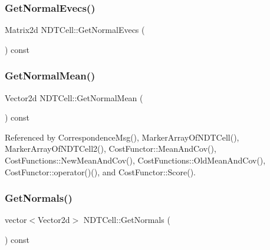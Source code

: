 \mbox{\label{classNDTCell_a15edc678da9fcc206a2a1697bc893463}} 
\subsubsection{\texorpdfstring{Get\+Normal\+Evecs()}{GetNormalEvecs()}}
{\footnotesize\ttfamily Matrix2d N\+D\+T\+Cell\+::\+Get\+Normal\+Evecs (\begin{DoxyParamCaption}{ }\end{DoxyParamCaption}) const\hspace{0.3cm}{\ttfamily [inline]}}

\mbox{\label{classNDTCell_ac4567367161fe878a2fe86b8f29aba04}} 
\subsubsection{\texorpdfstring{Get\+Normal\+Mean()}{GetNormalMean()}}
{\footnotesize\ttfamily Vector2d N\+D\+T\+Cell\+::\+Get\+Normal\+Mean (\begin{DoxyParamCaption}{ }\end{DoxyParamCaption}) const\hspace{0.3cm}{\ttfamily [inline]}}



Referenced by Correspondence\+Msg(), Marker\+Array\+Of\+N\+D\+T\+Cell(), Marker\+Array\+Of\+N\+D\+T\+Cell2(), Cost\+Functor\+::\+Mean\+And\+Cov(), Cost\+Functions\+::\+New\+Mean\+And\+Cov(), Cost\+Functions\+::\+Old\+Mean\+And\+Cov(), Cost\+Functor\+::operator()(), and Cost\+Functor\+::\+Score().

\mbox{\label{classNDTCell_a04b9a2c831ecb8bcd5c0f5a1e183a248}} 
\subsubsection{\texorpdfstring{Get\+Normals()}{GetNormals()}}
{\footnotesize\ttfamily vector$<$Vector2d$>$ N\+D\+T\+Cell\+::\+Get\+Normals (\begin{DoxyParamCaption}{ }\end{DoxyParamCaption}) const\hspace{0.3cm}{\ttfamily [inline]}}



